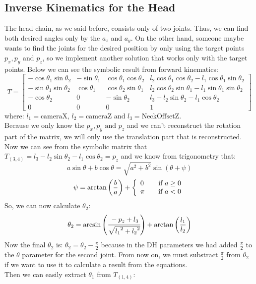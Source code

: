 \subsection{Inverse Kinematics for the Head}
The head chain, as we said before, consists only of two joints. Thus, we can find both desired angles only by the \(a_z\) and \(a_y\). On the other hand, someone maybe wants to find the joints for the desired position by only using the target points \(p_x,p_y\text{ and }p_z\), so we implement another solution that works only with the target points. Below we can see the symbolic result from forward kinematics:
\[
T = 
\begin{bmatrix}
-\cos\theta_1\sin\theta_2 & -\sin\theta_1 & \cos\theta_1\cos\theta_2 &  l_2\cos\theta_1\cos\theta_2 - l_1\cos\theta_1\sin\theta_2\\
-\sin\theta_1\sin\theta_2 & \cos\theta_1 & \cos\theta_2\sin\theta_1 & l_2\cos\theta_2\sin\theta_1 - l_1\sin\theta_1\sin\theta_2\\
-\cos\theta_2 & 0 & -\sin\theta_2 & l_3 - l_2\sin\theta_2 - l_1\cos\theta_2\\
0 & 0 & 0 & 1
\end{bmatrix}
\]
where: \(l_1 = \text{cameraX, }l_2 = \text{cameraZ and }l_3 = \text{NeckOffsetZ}\).\\
Because we only know the \(p_x,p_y\text{ and }p_z\) and we can't reconstruct the rotation part of the matrix, we will only use the translation part that is reconstructed. Now we can see from the symbolic matrix that \(T_{(3,4)} = l_3 - l_2\sin\theta_2 - l_1\cos\theta_2 = p_z\) and we know from trigonometry that: 
\[
a\sin\theta + b\cos\theta = \sqrt{a^2+b^2}\sin\left(\theta + \psi\right)
\]
\[
\psi=\arctan\left(\frac{b}{a}\right) + \left\{ 
  \begin{array}{l l}
    0 & \quad \text{if }a\geq0\\
    \pi & \quad \text{if }a<0\\
  \end{array} \right.
\]
So, we can now calculate \(\theta_2\):
\[
\theta_2 = \arcsin\left(\cfrac{-p_z+l_3}{\sqrt{{l_1}^2+{l_2}^2}}\right) + \arctan\left(\frac{l_1}{l_2}\right)
\]
Now the final \(\theta_2\) is: \(\theta_2 = \theta_2 - \frac{\pi}{2}\) because in the DH parameters we had added \(\frac{\pi}{2}\) to the \(\theta\) parameter for the second joint.  From now on, we must substract \(\frac{\pi}{2}\) from \(\theta_2\) if we want to use it to calculate a result from the equations.\\
Then we can easily extract \(\theta_1\) from \(T_{(1,4)}\):
